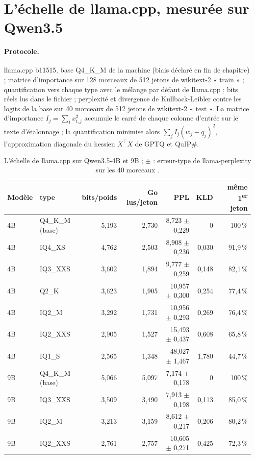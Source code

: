 \section{L'échelle de llama.cpp, mesurée sur Qwen3.5}\label{sec:echelle}

\paragraph{Protocole.} llama.cpp b11515, base Q4\_K\_M de la machine (biais déclaré en fin de chapitre) ; matrice d'importance sur 128 morceaux de 512 jetons de wikitext-2 « train » ; quantification vers chaque type avec le mélange par défaut de llama.cpp ; bits réels lus dans le fichier ; perplexité et divergence de Kullback-Leibler contre les logits de la base sur 40 morceaux de 512 jetons de wikitext-2 « test ». La matrice d'importance $I_j = \sum_t x_{t,j}^2$ accumule le carré de chaque colonne d'entrée sur le texte d'étalonnage ; la quantification minimise alors $\sum_j I_j (w_j - q_j)^2$, l'approximation diagonale du hessien $X^\top X$ de GPTQ et QuIP\#.

\begin{table}[ht]
\centering\small
\caption[L'échelle de llama.cpp sur Qwen3.5-4B et 9B]{L'échelle de llama.cpp sur Qwen3.5-4B et 9B ; $\pm$ : erreur-type de llama-perplexity sur les 40 morceaux \mes.}
\label{tab:echelle}
\begin{tabular}{@{}llrrrrr@{}}
\toprule
Modèle & type & bits/poids & Go lus/jeton & PPL & KLD & même 1\textsuperscript{er} jeton \\
\midrule
4B & Q4\_K\_M (base) & 5,193 & 2,730 & 8,723 $\pm$ 0,229 & 0 & 100\,\% \\
4B & IQ4\_XS & 4,762 & 2,503 & 8,908 $\pm$ 0,236 & 0,030 & 91,9\,\% \\
4B & IQ3\_XXS & 3,602 & 1,894 & 9,777 $\pm$ 0,259 & 0,148 & 82,1\,\% \\
4B & Q2\_K & 3,623 & 1,905 & 10,957 $\pm$ 0,300 & 0,254 & 77,4\,\% \\
4B & IQ2\_M & 3,292 & 1,731 & 10,956 $\pm$ 0,293 & 0,269 & 76,4\,\% \\
4B & IQ2\_XXS & 2,905 & 1,527 & 15,493 $\pm$ 0,437 & 0,608 & 65,8\,\% \\
4B & IQ1\_S & 2,565 & 1,348 & 48,027 $\pm$ 1,467 & 1,780 & 44,7\,\% \\
\midrule
9B & Q4\_K\_M (base) & 5,066 & 5,097 & 7,174 $\pm$ 0,178 & 0 & 100\,\% \\
9B & IQ3\_XXS & 3,509 & 3,490 & 7,913 $\pm$ 0,198 & 0,113 & 85,0\,\% \\
9B & IQ2\_M & 3,213 & 3,159 & 8,612 $\pm$ 0,217 & 0,206 & 80,2\,\% \\
9B & IQ2\_XXS & 2,761 & 2,757 & 10,605 $\pm$ 0,271 & 0,425 & 72,3\,\% \\
\bottomrule
\end{tabular}
\end{table}

